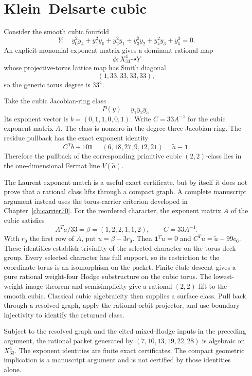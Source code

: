 \section{Klein--Delsarte cubic}
Consider the smooth cubic fourfold
\[
Y:\quad y_0^2y_4+y_1^2y_0+y_2^2y_1+y_3^2y_2+y_4^2y_3+y_5^3=0.
\]
An explicit monomial exponent matrix gives a dominant rational map
\[
\phi:X_{33}^4\dashrightarrow Y
\]
whose projective-torus lattice map has Smith diagonal
\[
(1,33,33,33,33),
\]
so the generic torus degree is \(33^4\).

Take the cubic Jacobian-ring class
\[
P(y)=y_1y_2y_5.
\]
Its exponent vector is $b=(0,1,1,0,0,1)$. Write $C=33A^{-1}$ for the cubic exponent matrix $A$. The class is nonzero in the degree-three Jacobian ring. The residue pullback has the exact exponent identity
\begin{equation}\label{eq:legacy-10.1}
C^Tb+10\mathbf1=(6,18,27,9,12,21)=\widetilde a-\mathbf1.\end{equation}
Therefore the pullback of the corresponding primitive cubic \((2,2)\)-class lies in the one-dimensional Fermat line \(V(\widetilde a)\).

The Laurent exponent match is a useful exact certificate, but by itself it does not prove that a rational class lifts through a compact graph. A complete manuscript argument instead uses the torus-carrier criterion developed in Chapter~\ref{ch:carrier70}. For the reordered character, the exponent matrix $A$ of the cubic satisfies
\[
A^T\widetilde a/33=\beta=(1,2,2,1,1,2),\qquad C=33A^{-1}.
\]
With $r_0$ the first row of $A$, put $u=\beta-3r_0$. Then $\mathbf1^Tu=0$ and $C^Tu=\widetilde a-99e_0$. These identities establish triviality of the selected character on the torus deck group. Every selected character has full support, so its restriction to the coordinate torus is an isomorphism on the packet. Finite étale descent gives a pure rational weight-four Hodge substructure on the cubic torus. The lowest-weight image theorem and semisimplicity give a rational $(2,2)$ lift to the smooth cubic. Classical cubic algebraicity then supplies a surface class. Pull back through a resolved graph, apply the rational orbit projector, and use boundary injectivity to identify the returned class.

\begin{manuscriptclaim}
Subject to the resolved graph and the cited mixed-Hodge inputs in the preceding argument, the rational packet generated by $(7,10,13,19,22,28)$ is algebraic on $X_{33}^4$. The exponent identities are finite exact certificates. The compact geometric implication is a manuscript argument and is not certified by those identities alone.
\end{manuscriptclaim}



